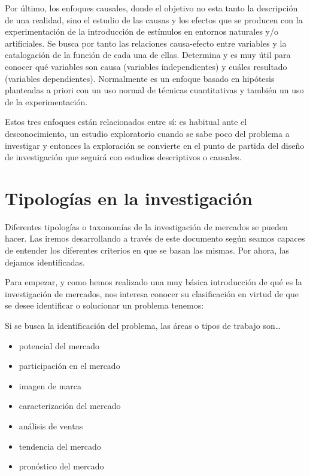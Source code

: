 \documentclass[
]{book}
\providecommand{\tightlist}{%
  \setlength{\itemsep}{0pt}\setlength{\parskip}{0pt}}
\begin{document}
Por último, los enfoques causales, donde el objetivo no esta tanto la descripción de una realidad, sino el estudio de las causas y los efectos que se producen con la experimentación de la introducción de estímulos en entornos naturales y/o artificiales. Se busca por tanto las relaciones causa-efecto entre variables y la catalogación de la función de cada una de ellas. Determina y es muy útil para conocer qué variables son causa (variables independientes) y cuáles resultado (variables dependientes). Normalmente es un enfoque basado en hipótesis planteadas a priori con un uso normal de técnicas cuantitativas y también un uso de la experimentación.

Estos tres enfoques están relacionados entre sí: es habitual ante el desconocimiento, un estudio exploratorio cuando se sabe poco del problema a investigar y entonces la exploración se convierte en el punto de partida del diseño de investigación que seguirá con estudios descriptivos o causales.

\hypertarget{tipologuxedas-en-la-investigaciuxf3n}{%
\section{Tipologías en la investigación}\label{tipologuxedas-en-la-investigaciuxf3n}}

Diferentes tipologías o taxonomías de la investigación de mercados se pueden hacer. Las iremos desarrollando a través de este documento según seamos capaces de entender los diferentes criterios en que se basan las mismas. Por ahora, las dejamos identificadas.

Para empezar, y como hemos realizado una muy básica introducción de qué es la investigación de mercados, nos interesa conocer su clasificación en virtud de que se desee identificar o solucionar un problema tenemos:

Si se busca la identificación del problema, las áreas o tipos de trabajo son\ldots{}

\begin{itemize}
\tightlist
\item
  potencial del mercado
\item
  participación en el mercado
\item
  imagen de marca
\item
  caracterización del mercado
\item
  análisis de ventas
\item
  tendencia del mercado
\item
  pronóstico del mercado
\end{itemize}
\end{document}
